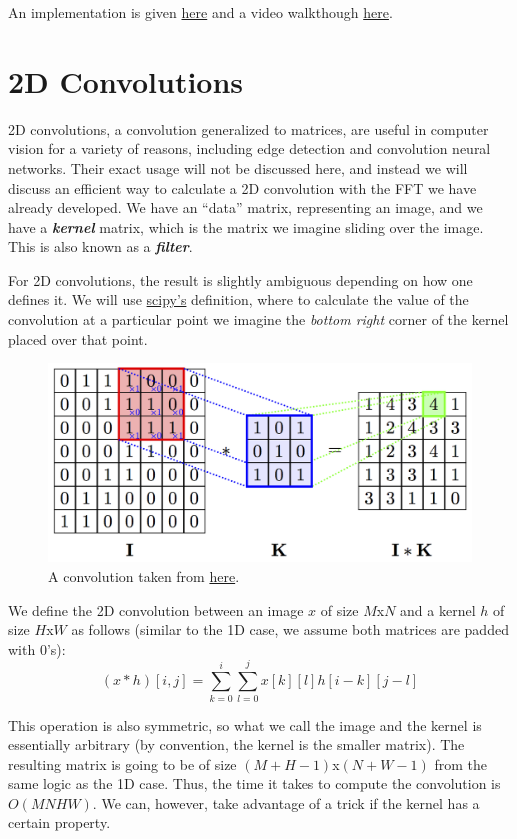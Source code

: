 \documentclass[11pt, oneside]{article}
\newcommand{\emphasis}[1]{\textbf{\textit{#1}}}
\theoremstyle{plain}
\theoremstyle{definition}
\begin{document}
An implementation is given
\href{https://github.com/stephen-huan/anime-music-quiz}{here} and a video
walkthough \href{https://www.youtube.com/watch?v=7fUicc_lIGA}{here}.

\section{2D Convolutions}
2D convolutions, a convolution generalized to matrices, are useful in computer
vision for a variety of reasons, including edge detection and convolution neural
networks. Their exact usage will not be discussed here, and instead we will 
discuss an efficient way to calculate a 2D convolution with the FFT we 
have already developed. We have an \enquote{data} matrix, representing an image,
and we have a \emphasis{kernel} matrix, which is the matrix we imagine
sliding over the image. This is also known as a \emphasis{filter}.

For 2D convolutions, the result is slightly ambiguous depending on how one
defines it. We will use
\href{https://docs.scipy.org/doc/scipy/reference/generated/scipy.signal.convolve2d.html}{scipy's}
definition, where to calculate the value of the convolution at a particular
point we imagine the \textit{bottom right} corner of the kernel
placed over that point.

\begin{figure}[h!]
  \centering
  \includegraphics[scale=1.5]{conv.png}
  \caption{A convolution taken from \href{https://petar-v.com/GAT/}{here}.}
\end{figure}

We define the 2D convolution between an image \( x \) of size \( M \)x\( N \)
and a kernel \( h \) of size \( H \)x\( W \) as follows
(similar to the 1D case, we assume both matrices are padded with 0's):
\[ (x * h)[i, j] = \sum^i_{k = 0} \sum^j_{l = 0} x[k][l]h[i - k][j - l] \]

This operation is also symmetric, so  what we call the image and the kernel
is essentially arbitrary (by convention, the kernel is the smaller matrix).
The resulting matrix is going to be of size \( (M + H - 1) \)x\( (N + W - 1) \)
from the same logic as the 1D case. 
Thus, the time it takes to compute the convolution is \( O(MNHW) \).
We can, however, take advantage of a trick if the kernel has a certain property.
\end{document}
